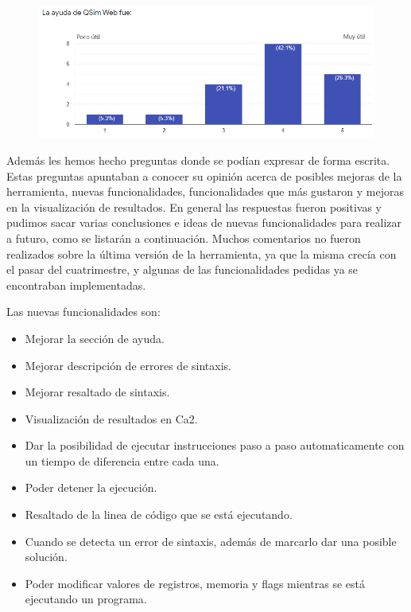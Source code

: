 \begin{figure}[H]
  \centering
  \includegraphics[width=16cm]{figuras/07_encuesta_ayuda.png}
\end{figure}

Además les hemos hecho preguntas donde se podían expresar de forma escrita. 
Estas preguntas apuntaban a conocer su opinión acerca de posibles mejoras de la herramienta, nuevas funcionalidades, funcionalidades que más gustaron y mejoras en la visualización
de resultados.
En general las respuestas fueron positivas y pudimos sacar varias conclusiones e ideas de nuevas funcionalidades para realizar a futuro, como se listarán a continuación.
Muchos comentarios no fueron realizados sobre la última versión de la herramienta, ya que la misma crecía con el pasar del cuatrimestre, y algunas de las funcionalidades pedidas
ya se encontraban implementadas.

Las nuevas funcionalidades son:
\begin{itemize}
  \item Mejorar la sección de ayuda.
  \item Mejorar descripción de errores de sintaxis.
  \item Mejorar resaltado de sintaxis.
  \item Visualización de resultados en Ca2.
  \item Dar la posibilidad de ejecutar instrucciones paso a paso automaticamente con un tiempo de diferencia entre cada una.
  \item Poder detener la ejecución.
  \item Resaltado de la linea de código que se está ejecutando.
  \item Cuando se detecta un error de sintaxis, además de marcarlo dar una posible solución.
  \item Poder modificar valores de registros, memoria y flags mientras se está ejecutando un programa.
\end{itemize}